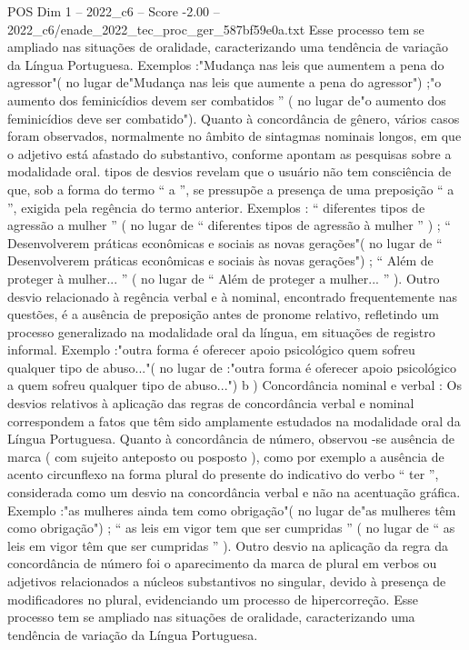 \begin{textsample}{POS Dim 1 – 2022\_c6 – Score -2.00 – 2022\_c6/enade\_2022\_tec\_proc\_ger\_587bf59e0a.txt}
Esse processo tem se ampliado nas situações de oralidade, caracterizando uma tendência de variação da Língua Portuguesa.
Exemplos :"Mudança nas leis que aumentem a pena do agressor"( no lugar de"Mudança nas leis que aumente a pena do agressor") ;"o aumento dos feminicídios devem ser combatidos ” ( no lugar de"o aumento dos feminicídios deve ser combatido").
Quanto à concordância de gênero, vários casos foram observados, normalmente no âmbito de sintagmas nominais longos, em que o adjetivo está afastado do substantivo, conforme apontam as pesquisas sobre a modalidade oral. tipos de desvios revelam que o usuário não tem consciência de que, sob a forma do termo “ a ”, se pressupõe a presença de uma preposição “ a ”, exigida pela regência do termo anterior.
Exemplos : “ diferentes tipos de agressão a mulher ” ( no lugar de “ diferentes tipos de agressão à mulher ” ) ; “ Desenvolverem práticas econômicas e sociais as novas gerações"( no lugar de “ Desenvolverem práticas econômicas e sociais às novas gerações") ; “ Além de proteger à mulher... ” ( no lugar de “ Além de proteger a mulher... ” ).
Outro desvio relacionado à regência verbal e à nominal, encontrado frequentemente nas questões, é a ausência de preposição antes de pronome relativo, refletindo um processo generalizado na modalidade oral da língua, em situações de registro informal.
Exemplo :"outra forma é oferecer apoio psicológico quem sofreu qualquer tipo de abuso..."( no lugar de :"outra forma é oferecer apoio psicológico a quem sofreu qualquer tipo de abuso...") b ) Concordância nominal e verbal : Os desvios relativos à aplicação das regras de concordância verbal e nominal correspondem a fatos que têm sido amplamente estudados na modalidade oral da Língua Portuguesa.
Quanto à concordância de número, observou -se ausência de marca ( com sujeito anteposto ou posposto ), como por exemplo a ausência de acento circunflexo na forma plural do presente do indicativo do verbo “ ter ”, considerada como um desvio na concordância verbal e não na acentuação gráfica.
Exemplo :"as mulheres ainda tem como obrigação"( no lugar de"as mulheres têm como obrigação") ; “ as leis em vigor tem que ser cumpridas ” ( no lugar de “ as leis em vigor têm que ser cumpridas ” ).
Outro desvio na aplicação da regra da concordância de número foi o aparecimento da marca de plural em verbos ou adjetivos relacionados a núcleos substantivos no singular, devido à presença de modificadores no plural, evidenciando um processo de hipercorreção.
Esse processo tem se ampliado nas situações de oralidade, caracterizando uma tendência de variação da Língua Portuguesa.

\end{textsample}
